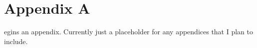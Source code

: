 \chapter{Appendix A}
\label{app:app01}

egins an appendix. Currently just a placeholder for any appendices that I plan to include.
